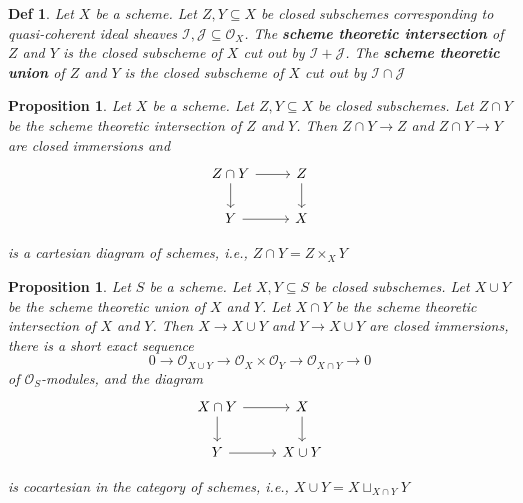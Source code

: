 \documentclass{article}
\newtheorem{definition}[theorem]{Def}
\newtheorem{proposition}[theorem]{Proposition}
\begin{document}
\begin{definition}
    Let $X$ be a scheme. Let $Z,Y\subseteq X$ be closed subschemes corresponding to quasi-coherent ideal sheaves $\mathcal I,\mathcal J \subseteq \mathcal O_X$. The \textbf{scheme theoretic intersection} of $Z$ and $Y$ is the closed subscheme of $X$ cut out by $\mathcal I+\mathcal J$. The \textbf{scheme theoretic union} of $Z$ and $Y$ is the closed subscheme of $X$ cut out by $\mathcal I \cap \mathcal J$
\end{definition}

\begin{proposition}
    Let $X$ be a scheme. Let $Z,Y\subseteq X$ be closed subschemes. Let $Z \cap Y$ be the scheme theoretic intersection of $Z$ and $Y$. Then $Z \cap Y \to Z$ and $Z \cap Y \to Y$ are closed immersions and
    \[\begin{tikzcd}
	{Z \cap Y} & Z \\
	Y & X
	\arrow[from=1-1, to=2-1]
	\arrow[from=2-1, to=2-2]
	\arrow[from=1-2, to=2-2]
	\arrow[from=1-1, to=1-2]
\end{tikzcd}\]

is a cartesian diagram of schemes, i.e., $Z\cap Y=Z\times_XY$
\end{proposition}

\begin{proposition}
    Let $S$ be a scheme. Let $X,Y \subseteq S$ be closed subschemes. Let $X\cup Y$ be the scheme theoretic union of $X$ and $Y$. Let $X\cap Y$ be the scheme theoretic intersection of $X$ and $Y$. Then $X \to X\cup Y$ and $Y \to X\cup Y$ are closed immersions, there is a short exact sequence
$$
0 \to \mathcal O_{X\cup Y} \to \mathcal O_X \times \mathcal O_Y \to \mathcal O_{X\cap Y} \to 0$$
of $\mathcal O_S$-modules, and the diagram
\[\begin{tikzcd}
	{X \cap Y} & X \\
	Y & {X\cup Y}
	\arrow[from=1-1, to=2-1]
	\arrow[from=2-1, to=2-2]
	\arrow[from=1-2, to=2-2]
	\arrow[from=1-1, to=1-2]
\end{tikzcd}\]

is cocartesian in the category of schemes, i.e., $X\cup Y=X\sqcup _{X\cap Y}Y$
\end{proposition}
\end{document}
